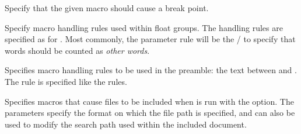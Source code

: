 \begin{description}
Specify that the given macro should cause a break point.

Specify macro handling rules used within float groups. The handling rules are specified as for . Most commonly, the parameter rule will be the / to specify that words should be counted as \textit{other words}.

Specifies macro handling rules to be used in the preamble: the text between  and . The rule is specified like the  rules.

Specifies macros that cause files to be included when \TeXcount{} is run with the  option. The parameters specify the format on which the file path is specified, and can also be used to modify the search path used within the included document.

\end{description}
